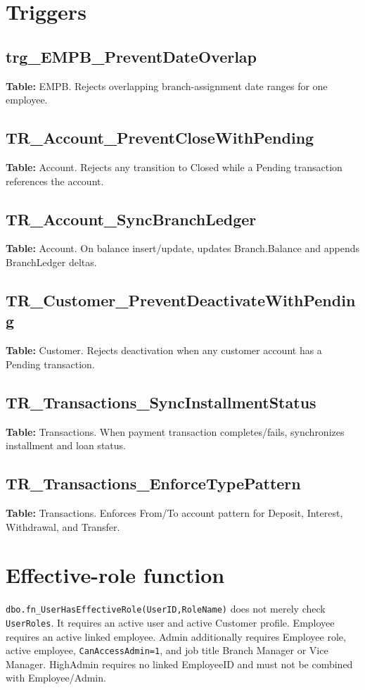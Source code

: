 \documentclass[11pt,a4paper,oneside]{report}
\begin{document}
\section{Triggers}
\subsection{trg\_EMPB\_PreventDateOverlap}
\textbf{Table:} EMPB. Rejects overlapping branch-assignment date ranges for one employee.
\subsection{TR\_Account\_PreventCloseWithPending}
\textbf{Table:} Account. Rejects any transition to Closed while a Pending transaction references the account.
\subsection{TR\_Account\_SyncBranchLedger}
\textbf{Table:} Account. On balance insert/update, updates Branch.Balance and appends BranchLedger deltas.
\subsection{TR\_Customer\_PreventDeactivateWithPending}
\textbf{Table:} Customer. Rejects deactivation when any customer account has a Pending transaction.
\subsection{TR\_Transactions\_SyncInstallmentStatus}
\textbf{Table:} Transactions. When payment transaction completes/fails, synchronizes installment and loan status.
\subsection{TR\_Transactions\_EnforceTypePattern}
\textbf{Table:} Transactions. Enforces From/To account pattern for Deposit, Interest, Withdrawal, and Transfer.

\section{Effective-role function}
\texttt{dbo.fn\_UserHasEffectiveRole(UserID,RoleName)} does not merely check \texttt{UserRoles}. It requires an active user and active Customer profile. Employee requires an active linked employee. Admin additionally requires Employee role, active employee, \texttt{CanAccessAdmin=1}, and job title Branch Manager or Vice Manager. HighAdmin requires no linked EmployeeID and must not be combined with Employee/Admin.
\end{document}
